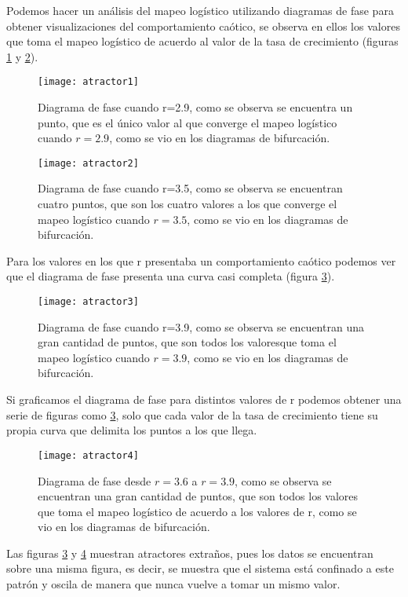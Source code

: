 Podemos hacer un análisis del mapeo logístico utilizando diagramas de fase para obtener visualizaciones del comportamiento caótico, se observa en ellos los valores que toma el mapeo logístico de acuerdo al valor de la tasa de crecimiento (figuras \ref{atr1} y \ref{atr2}).

\begin{figure}[ht!]
\centering
\texttt{[image: atractor1]}
\caption{Diagrama de fase cuando r=2.9, como se observa se encuentra un punto, que es el único valor al que converge el mapeo logístico cuando $r=2.9$, como se vio en los diagramas de bifurcación.}
\label{atr1}
\end{figure}

\begin{figure}[ht!]
\centering
\texttt{[image: atractor2]}
\caption{Diagrama de fase cuando r=3.5, como se observa se encuentran cuatro puntos, que son los cuatro valores a los que converge el mapeo logístico cuando $r=3.5$, como se vio en los diagramas de bifurcación.}
\label{atr2}
\end{figure}
\pagebreak

Para los valores en los que r presentaba un comportamiento caótico podemos ver que el diagrama de fase presenta una curva casi completa (figura \ref{atr3}).

\begin{figure}[ht!]
\centering
\texttt{[image: atractor3]}
\caption{Diagrama de fase cuando r=3.9, como se observa se encuentran una gran cantidad de puntos, que son todos los valoresque toma el mapeo logístico cuando $r=3.9$, como se vio en los diagramas de bifurcación.}
\label{atr3}
\end{figure}
\pagebreak

Si graficamos el diagrama de fase para distintos valores de r podemos obtener una serie de figuras como \ref{atr3}, solo que cada valor de la tasa de crecimiento tiene su propia curva que delimita los puntos a los que llega.

\begin{figure}[ht!]
\centering
\texttt{[image: atractor4]}
\caption{Diagrama de fase desde $r=3.6$ a $r=3.9$, como se observa se encuentran una gran cantidad de puntos, que son todos los valores que toma el mapeo logístico de acuerdo a los valores de r, como se vio en los diagramas de bifurcación.}
\label{atr4}
\end{figure}

Las figuras \ref{atr3} y \ref{atr4} muestran atractores extraños, pues los datos se encuentran sobre una misma figura, es decir, se muestra que el sistema está confinado a este patrón y oscila de manera que nunca vuelve a tomar un mismo valor.


